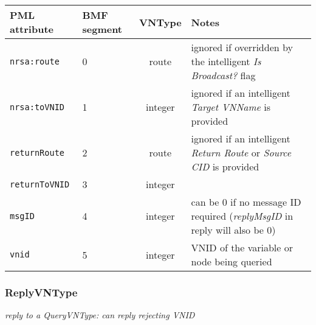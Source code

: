 \documentclass[pdftex,a4paper]{article}
\newcommand{\XMLfont}[1]{{\tt \small #1}}
\begin{document}
\begin{table}[!h]
  \begin{center}
    \label{tab:QueryVNType}
    \begin{tabular}{|l|p{13mm}|c|p{60mm}|}
      \hline

      \textbf{PML attribute} & \textbf{BMF segment} & \textbf{VNType}
      & \textbf{Notes} \\\hline

      \XMLfont{nrsa:route} & 0 & route & ignored if overridden by the
      intelligent {\em Is Broadcast?} flag \\\hline

      \XMLfont{nrsa:toVNID} & 1 & integer & ignored if an intelligent {\em
      Target VNName} is provided \\\hline

      \XMLfont{returnRoute} & 2 & route & ignored if an
      intelligent {\em Return Route} or {\em Source CID} is provided
      \\\hline

      \XMLfont{returnToVNID} & 3 & integer & \\\hline

      \XMLfont{msgID} & 4 & integer & can be 0 if no message ID
      required ({\em replyMsgID} in reply will also be 0) \\\hline

      \XMLfont{vnid} & 5 & integer & VNID of the variable or node
      being queried \\\hline

    \end{tabular}
  \end{center}
\end{table}

\subsubsection{ReplyVNType}
{\em reply to a QueryVNType: can reply rejecting VNID}
\end{document}
